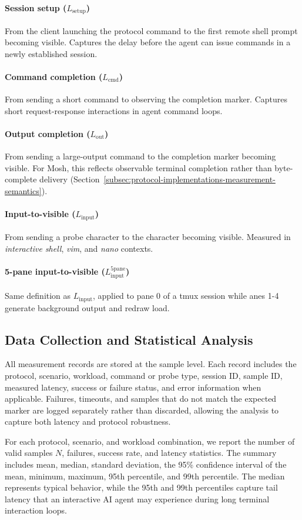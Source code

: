 \paragraph{Session setup ($L_{\mathrm{setup}}$)}
From the client launching the protocol command to the first remote shell prompt becoming visible. Captures the delay before the agent can issue commands in a newly established session.

\paragraph{Command completion ($L_{\mathrm{cmd}}$)}
From sending a short command to observing the completion marker. Captures short request-response interactions in agent command loops.

\paragraph{Output completion ($L_{\mathrm{out}}$)}
From sending a large-output command to the completion marker becoming visible. For Mosh, this reflects observable terminal completion rather than byte-complete delivery (Section~\ref{subsec:protocol-implementations-measurement-semantics}).

\paragraph{Input-to-visible ($L_{\mathrm{input}}$)}
From sending a probe character to the character becoming visible. Measured in \textit{interactive shell}, \textit{vim}, and \textit{nano} contexts.

\paragraph{5-pane input-to-visible ($L_{\mathrm{input}}^{\mathrm{5pane}}$)}
Same definition as $L_{\mathrm{input}}$, applied to pane 0 of a tmux session while anes 1-4 generate background output and redraw load.

\subsection{Data Collection and Statistical Analysis}
\label{subsec:data-collection-statistical-analysis}

All measurement records are stored at the sample level. Each record includes the protocol, scenario, workload, command or probe type, session ID, sample ID, measured latency, success or failure status, and error information when applicable. Failures, timeouts, and samples that do not match the expected marker are logged separately rather than discarded, allowing the analysis to capture both latency and protocol robustness.

For each protocol, scenario, and workload combination, we report the number of valid samples $N$, failures, success rate, and latency statistics. The summary includes mean, median, standard deviation, the 95\% confidence interval of the mean, minimum, maximum, 95th percentile, and 99th percentile. The median represents typical behavior, while the 95th and 99th percentiles capture tail latency that an interactive AI agent may experience during long terminal interaction loops.